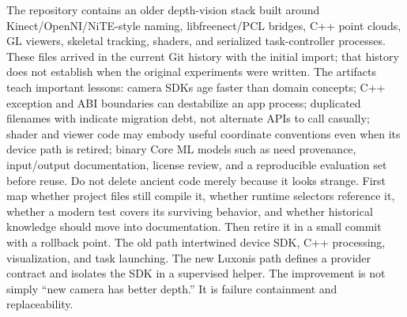 {}The repository contains an older depth-vision stack built around Kinect/OpenNI/NiTE-style naming, libfreenect/PCL bridges, C++ point clouds, GL viewers, skeletal tracking, shaders, and serialized task-controller processes. These files arrived in the current Git history with the initial import; that history does not establish when the original experiments were written.\markdownRendererParagraphSeparator
{}The artifacts teach important lessons:\markdownRendererInterblockSeparator
{}\markdownRendererUlBegin
\markdownRendererUlItem camera SDKs age faster than domain concepts;\markdownRendererUlItemEnd 
\markdownRendererUlItem C++ exception and ABI boundaries can destabilize an app process;\markdownRendererUlItemEnd 
\markdownRendererUlItem duplicated filenames with  indicate migration debt, not alternate APIs to call casually;\markdownRendererUlItemEnd 
\markdownRendererUlItem shader and viewer code may embody useful coordinate conventions even when its device path is retired;\markdownRendererUlItemEnd 
\markdownRendererUlItem binary Core ML models such as  need provenance, input/output documentation, license review, and a reproducible evaluation set before reuse.\markdownRendererUlItemEnd 
\markdownRendererUlEnd \markdownRendererInterblockSeparator
{}Do not delete ancient code merely because it looks strange. First map whether project files still compile it, whether runtime selectors reference it, whether a modern test covers its surviving behavior, and whether historical knowledge should move into documentation. Then retire it in a small commit with a rollback point.\markdownRendererInterblockSeparator
{}
\markdownRendererSectionEnd \markdownRendererSectionBegin
{}\markdownRendererInterblockSeparator
{}The old path intertwined device SDK, C++ processing, visualization, and task launching. The new Luxonis path defines a provider contract and isolates the SDK in a supervised helper. The improvement is not simply “new camera has better depth.” It is failure containment and replaceability.\markdownRendererInterblockSeparator
{}\markdownRendererInterblockSeparator

